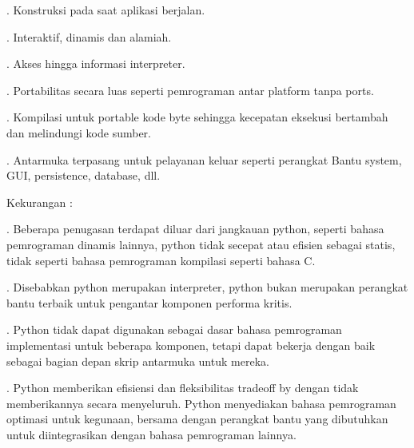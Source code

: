\noindent 
{\fontsize{14pt}{14pt}. Konstruksi pada saat aplikasi berjalan. \\} \par
\noindent 
{\fontsize{14pt}{14pt}. Interaktif, dinamis dan alamiah. \\} \par
\noindent 
{\fontsize{14pt}{14pt}. Akses hingga informasi interpreter. \\} \par
\noindent 
{\fontsize{14pt}{14pt}. Portabilitas secara luas seperti pemrograman antar platform tanpa ports. \\} \par
\noindent 
{\fontsize{14pt}{14pt}. Kompilasi untuk portable kode byte sehingga kecepatan eksekusi bertambah dan melindungi kode sumber. \\} \par
\noindent 
{\fontsize{14pt}{14pt}. Antarmuka terpasang untuk pelayanan keluar seperti perangkat Bantu system, GUI, persistence, database, dll. \\} \par
\vspace{14pt}
\noindent 
{\fontsize{14pt}{14pt}\selectfont Kekurangan : \\} \par
\vspace{14pt}
\noindent 
{\fontsize{14pt}{14pt}. Beberapa penugasan terdapat diluar dari jangkauan python, seperti bahasa pemrograman dinamis lainnya, python tidak secepat atau efisien sebagai statis, tidak seperti bahasa pemrograman kompilasi seperti bahasa C. \\} \par
\noindent 
{\fontsize{14pt}{14pt}. Disebabkan python merupakan interpreter, python bukan merupakan perangkat bantu terbaik untuk pengantar komponen performa kritis. \\} \par
\noindent 
{\fontsize{14pt}{14pt}. Python tidak dapat digunakan sebagai dasar bahasa pemrograman implementasi untuk beberapa komponen, tetapi dapat bekerja dengan baik sebagai bagian depan skrip antarmuka untuk mereka. \\} \par
\noindent 
{\fontsize{14pt}{14pt}. Python memberikan efisiensi dan fleksibilitas tradeoff by dengan tidak memberikannya secara menyeluruh. Python menyediakan bahasa pemrograman optimasi untuk kegunaan, bersama dengan perangkat bantu yang dibutuhkan untuk diintegrasikan dengan bahasa pemrograman lainnya. \\} \par
